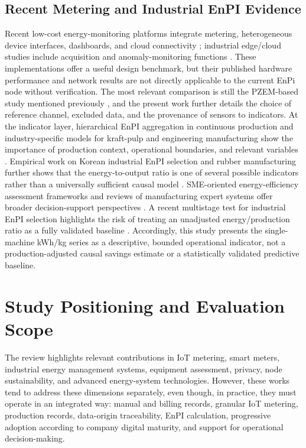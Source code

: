 \documentclass[technologies,article,submit,pdftex,moreauthors]{Definitions/mdpi}
\begin{document}
\subsection{Recent Metering and Industrial EnPI Evidence}
\label{subsec:recent-metering-enpi}

Recent low-cost energy-monitoring platforms integrate metering, heterogeneous device interfaces, dashboards, and cloud connectivity \cite{r3_khan2024}; industrial edge/cloud studies include acquisition and anomaly-monitoring functions \cite{r3_iiot2022}. These implementations offer a useful design benchmark, but their published hardware performance and network results are not directly applicable to the current EnPi node without verification. The most relevant comparison is still the PZEM-based study mentioned previously \cite{ref24}, and the present work further details the choice of reference channel, excluded data, and the provenance of sensors to indicators. At the indicator layer, hierarchical EnPI aggregation in continuous production and industry-specific models for kraft-pulp and engineering manufacturing show the importance of production context, operational boundaries, and relevant variables \cite{r3_hierarchy2020,r3_kraft2021,r3_rubber2020}. Empirical work on Korean industrial EnPI selection and rubber manufacturing further shows that the energy-to-output ratio is one of several possible indicators rather than a universally sufficient causal model \cite{r3_korea2021,r3_piccioni2024}. SME-oriented energy-efficiency assessment frameworks and reviews of manufacturing expert systems offer broader decision-support perspectives \cite{r3_atenea2025,r3_review2024}. A recent multistage test for industrial EnPI selection highlights the risk of treating an unadjusted energy/production ratio as a fully validated baseline \cite{r3_enpi2026}. Accordingly, this study presents the single-machine kWh/kg series as a descriptive, bounded operational indicator, not a production-adjusted causal savings estimate or a statistically validated predictive baseline.

\section{Study Positioning and Evaluation Scope}
\label{sec:research-gap}

The review highlights relevant contributions in IoT metering, smart meters, industrial energy management systems, equipment assessment, privacy, node sustainability, and advanced energy-system technologies. However, these works tend to address these dimensions separately, even though, in practice, they must operate in an integrated way: manual and billing records, granular IoT metering, production records, data-origin traceability, EnPI calculation, progressive adoption according to company digital maturity, and support for operational decision-making.
\end{document}
